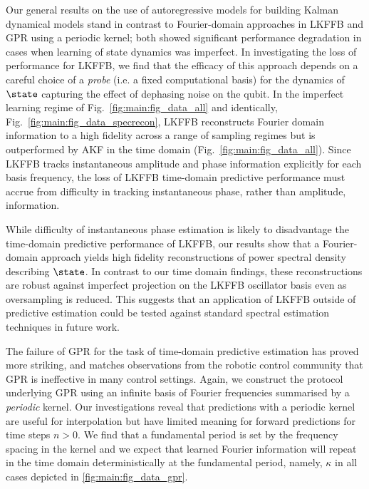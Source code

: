 Our general results on the use of autoregressive models for building Kalman dynamical models stand in contrast to Fourier-domain approaches in LKFFB and GPR using a periodic kernel;  both showed significant performance degradation in cases when learning of state dynamics was imperfect.  In investigating the loss of performance for LKFFB, we find that the efficacy of this approach depends on a careful choice of a \textit{probe} (i.e. a fixed computational basis) for the dynamics of $\state$ capturing the effect of dephasing noise on the qubit.  In the imperfect learning regime of Fig.~\ref{fig:main:fig_data_all} and identically, Fig.~\ref{fig:main:fig_data_specrecon}, LKFFB reconstructs Fourier domain information to a high fidelity across a range of sampling regimes but is outperformed by AKF in the time domain (Fig.~\ref{fig:main:fig_data_all}). Since LKFFB tracks instantaneous amplitude and phase information explicitly for each basis frequency, the loss of LKFFB time-domain predictive performance must accrue from difficulty in tracking instantaneous phase, rather than amplitude, information. 

While difficulty of instantaneous phase estimation is likely to disadvantage the time-domain predictive performance of LKFFB, our results show that a Fourier-domain approach yields high fidelity reconstructions of power spectral density describing $\state$. In contrast to our time domain findings, these reconstructions are robust against imperfect projection on the LKFFB oscillator basis even as oversampling is reduced. This suggests that an application of LKFFB outside of predictive estimation could be tested against standard spectral estimation techniques in future work.

The failure of GPR for the task of time-domain predictive estimation has proved more striking, and matches observations from the robotic control community that GPR is ineffective in many control settings.  Again, we construct the protocol underlying GPR using an infinite basis of Fourier frequencies summarised by a \textit{periodic} kernel.  Our investigations reveal that predictions with a periodic kernel are useful for interpolation but have limited meaning for forward predictions for time steps $n >0$.  We find that a fundamental period is set by the frequency spacing in the kernel and we expect that learned Fourier information will repeat in the time domain deterministically at the fundamental period, namely, $\kappa$ in all cases depicted in \cref{fig:main:fig_data_gpr}. 

